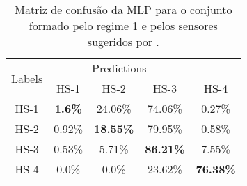 \documentclass[review]{elsarticle}
\begin{document}
\begin{table}[!htb]
\centering
\caption{Matriz de confusão da MLP para o conjunto formado pelo regime 1 e pelos sensores sugeridos por \cite{wang2008similarity}.}
\begin{tabular}{c|cccc}
\toprule
%         
\hline
\multirow{2}{*}{Labels} & \multicolumn{3}{c}{Predictions} \\ 
\cline{2-5}
                 & HS-1 & HS-2 & HS-3 & HS-4 \\ \hline            
HS-1 & \textbf{1.6\% } & 24.06\% & 74.06\% & 0.27\%   \\
HS-2 & 0.92\% & \textbf{18.55\%} & 79.95\% & 0.58\%   \\
HS-3 & 0.53\% & 5.71\%  & \textbf{86.21\%} & 7.55\%   \\
HS-4 & 0.0\%  & 0.0\%   & 23.62\% & \textbf{76.38\%}  \\
\hline
\bottomrule
\end{tabular}
\label{tab:tabela_de_confusao}
\end{table}
\end{document}
